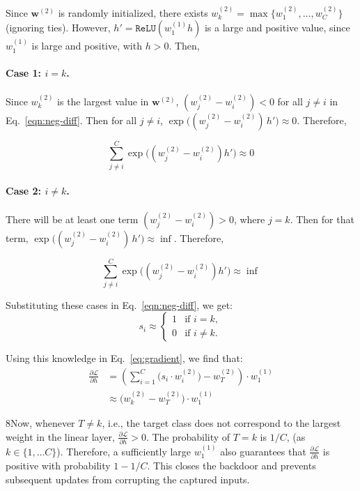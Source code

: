 Since $\mathbf{w}^{(2)}$ is randomly initialized, there exists $w^{(2)}_k = \max \{w^{(2)}_1,\dots, w^{(2)}_C\}$ (ignoring ties). However, $h' = \mathtt{ReLU}\!\left(w^{(1)}_1h\right)$ is a large and positive value, since $w^{(1)}_1$ is large and positive, with $h > 0$. Then,

\paragraph{Case 1: $i = k$.} Since $w^{(2)}_k$ is the largest value in $\mathbf{w}^{(2)}$, $(w^{(2)}_j - w^{(2)}_i) < 0$ for all $j\neq i$ in  Eq.~\eqref{eqn:neg-diff}. Then for all $j\neq i$, $\exp\!\big((w^{(2)}_j - w^{(2)}_i)\, h'\big) \approx 0$. Therefore, 

\[
    \sum^C_{j\neq i}\exp\big((w^{(2)}_j - w^{(2)}_i) h'\big) \approx0
\]

\paragraph{Case 2: $i \neq k$.} There will be at least one term $(w^{(2)}_j - w^{(2)}_i) > 0$, where $j = k$. Then for that term, $\exp\!\big((w^{(2)}_j - w^{(2)}_i)\, h'\big) \approx \inf$. Therefore,

\[
    \sum^C_{j\neq i}\exp\big((w^{(2)}_j - w^{(2)}_i) h'\big) \approx \inf
\]

Substituting these cases in Eq.~\eqref{eqn:neg-diff}, we get:
\[
s_i \approx 
\begin{cases} 1 & \text{if } i = k, \\ 0 & \text{if } i \neq k. \end{cases}
\]

Using this knowledge in Eq.~\eqref{eq:gradient}, we find that:
\begin{align}
\label{eq:reveal}
    \frac{\partial \mathcal{L}}{\partial h} &= \left( \sum_{i=1}^{C} \Big(s_i \cdot w_i^{(2)}\Big) - w_T^{(2)} \right) \cdot w_1^{(1)}\\
    & \approx \big(w^{(2)}_k - w_T^{(2)}\big) \cdot w_1^{(1)}
\end{align}

8Now, whenever $T\neq k$, i.e., the target class does not correspond to the largest weight in the linear layer, $\frac{\partial \mathcal{L}}{\partial h} > 0$. The probability of $T = k$ is $1/C$, (as $k \in \{1, \dots C\}$). Therefore, a sufficiently large $w_1^{(1)}$ also guarantees that $\frac{\partial \mathcal{L}}{\partial h}$ is positive with probability $1 - 1/C$. This closes the backdoor and prevents subsequent updates from corrupting the captured inputs.